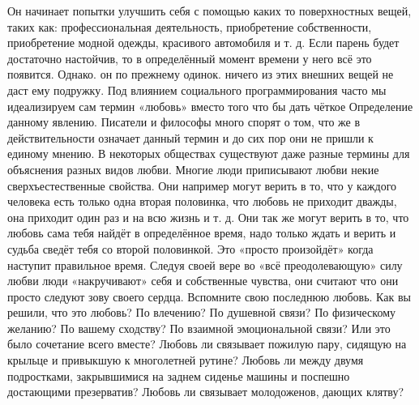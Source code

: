 Он начинает попытки улучшить себя с помощью каких то поверхностных вещей, таких как: профессиональная деятельность, приобретение собственности, приобретение модной одежды, красивого автомобиля и т. д. Если парень будет достаточно настойчив, то в определённый момент времени у него всё это появится. Однако. он по прежнему одинок. ничего из этих внешних вещей не даст ему подружку. Под влиянием социального программирования часто мы идеализируем сам термин «любовь» вместо того что бы дать чёткое Определение данному явлению. Писатели и философы много спорят о том, что же в действительности означает данный термин и до сих пор они не пришли к единому мнению. В некоторых обществах существуют даже разные термины для объяснения разных видов любви. Многие люди приписывают любви некие сверхъестественные свойства. Они например могут верить в то, что у каждого человека есть только одна вторая половинка, что любовь не приходит дважды, она приходит один раз и на всю жизнь и т. д. Они так же могут верить в то, что любовь сама тебя найдёт в определённое время, надо только ждать и верить и судьба сведёт тебя со второй половинкой. Это «просто произойдёт» когда наступит правильное время. Следуя своей вере во «всё преодолевающую» силу любви люди «накручивают» себя и собственные чувства, они считают что они просто следуют зову своего сердца. Вспомните свою последнюю любовь. Как вы решили, что это любовь? По влечению? По душевной связи? По физическому желанию? По вашему сходству? По взаимной эмоциональной связи? Или это было сочетание всего вместе? Любовь ли связывает пожилую пару, сидящую на крыльце и привыкшую к многолетней рутине? Любовь ли между двумя подростками, закрывшимися на заднем сиденье машины и поспешно достающими презерватив? Любовь ли связывает молодоженов, дающих клятву?

